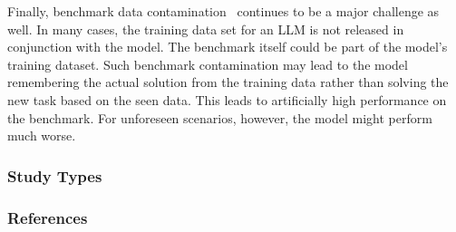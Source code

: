 Finally, benchmark data contamination~\cite{DBLP:journals/corr/abs-2406-04244} continues to be a major challenge as well.
In many cases, the training data set for an LLM is not released in conjunction with the model.
The benchmark itself could be part of the model's training dataset.
Such benchmark contamination may lead to the model remembering the actual solution from the training data rather than solving the new task based on the seen data.
This leads to artificially high performance on the benchmark.
For unforeseen scenarios, however, the model might perform much worse.



\subsubsection{Study Types}


\subsubsection{References}









